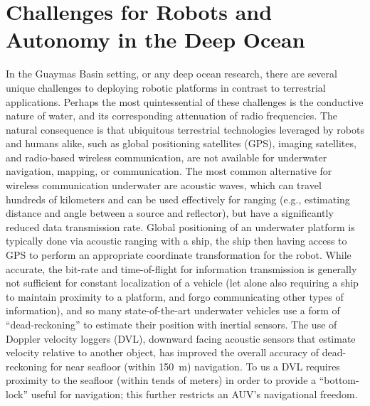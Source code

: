 \section{Challenges for Robots and Autonomy in the Deep Ocean}
\label{sec:ops_challenges}
In the Guaymas Basin setting, or any deep ocean research, there are several unique challenges to deploying robotic platforms in contrast to terrestrial applications. Perhaps the most quintessential of these challenges is the conductive nature of water, and its corresponding attenuation of radio frequencies\autocite{qureshi2016rf}. The natural consequence is that ubiquitous terrestrial technologies leveraged by robots and humans alike, such as global positioning satellites (GPS), imaging satellites, and radio-based wireless communication, are not available for underwater navigation, mapping, or communication. The most common alternative for wireless communication underwater are acoustic waves, which can travel hundreds of kilometers and can be used effectively for ranging (e.g., estimating distance and angle between a source and reflector), but have a significantly reduced data transmission rate\autocite{qureshi2016rf}. Global positioning of an underwater platform is typically done via acoustic ranging with a ship, the ship then having access to GPS to perform an appropriate coordinate transformation for the robot. While accurate, the bit-rate and time-of-flight for information transmission is generally not sufficient for constant localization of a vehicle (let alone also requiring a ship to maintain proximity to a platform, and forgo communicating other types of information), and so many state-of-the-art underwater vehicles use a form of ``dead-reckoning'' to estimate their position with inertial sensors. The use of Doppler velocity loggers (DVL), downward facing acoustic sensors that estimate velocity relative to another object, has improved the overall accuracy of dead-reckoning for near seafloor (within \SI{150}{\meter}) navigation\autocite{stutters2008navigation,liu2022dvl,fong2006evaluation,rigby2006towards}. To us a DVL requires proximity to the seafloor (within tends of meters) in order to provide a ``bottom-lock'' useful for navigation; this further restricts an AUV's navigational freedom.


